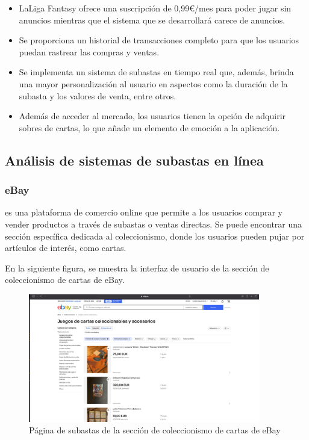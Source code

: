 \begin{itemize}
    \item LaLiga Fantasy ofrece una suscripción de 0,99€/mes para poder jugar sin anuncios mientras que el sistema que se desarrollará carece de anuncios.
    \item Se proporciona un historial de transacciones completo para que los usuarios puedan rastrear las compras y ventas.
    \item Se implementa un sistema de subastas en tiempo real que, además, brinda una mayor personalización al usuario en aspectos como la duración de la subasta y los valores de venta, entre otros.
    \item Además de acceder al mercado, los usuarios tienen la opción de adquirir sobres de cartas, lo que añade un elemento de emoción a la aplicación.
\end{itemize}



\subsection{Análisis de sistemas de subastas en línea}
\subsubsection{eBay}
 es una plataforma de comercio online que permite a los usuarios comprar y vender productos a través de subastas o ventas directas. Se puede encontrar una sección específica dedicada al coleccionismo, donde los usuarios pueden pujar por artículos de interés, como cartas.

En la siguiente figura, se muestra la interfaz de usuario de la sección de coleccionismo de cartas de eBay.
\begin{figure}[H]
    \centering
    \includegraphics[width=0.9\textwidth]{figures/4-Estudio-viabilidad/4_Ebay.png}
    \caption{Página de subastas de la sección de coleccionismo de cartas de eBay}
    \label{fig:ebay}
    \hypertarget{fig:ebay}{}
\end{figure} 

